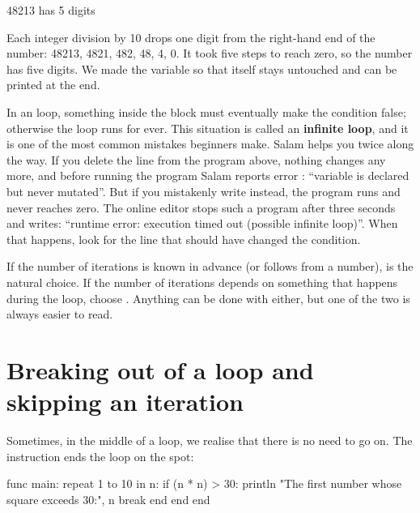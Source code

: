 \begin{salamout}
48213 has 5 digits
\end{salamout}

Each integer division by 10 drops one digit from the right-hand end of the
number: 48213, 4821, 482, 48, 4, 0. It took five steps to reach zero, so the
number has five digits. We made the variable  so that
 itself stays untouched and can be printed at the end.

\begin{warn}
In an  loop, something inside the block must eventually make
the condition false; otherwise the loop runs for ever. This situation is
called an \textbf{infinite loop}, and it is one of the most common mistakes
beginners make. Salam helps you twice along the way. If you delete the line
 from the program above, nothing changes
 any more, and before running the program Salam reports
error : ``variable  is declared
 but never mutated''. But if you mistakenly write
 instead, the program runs and  never
reaches zero. The online editor stops such a program after three seconds and
writes: ``runtime error: execution timed out (possible infinite loop)''.
When that happens, look for the line that should have changed the condition.
\end{warn}

\begin{note}
If the number of iterations is known in advance (or follows from a number),
 is the natural choice. If the number of iterations depends on
something that happens during the loop, choose . Anything can
be done with either, but one of the two is always easier to read.
\end{note}

\section{Breaking out of a loop and skipping an iteration}

Sometimes, in the middle of a loop, we realise that there is no need to go
on. The instruction  ends the loop on the spot:

\begin{salamcode}
func main:
    repeat 1 to 10 in n:
        if (n * n) > 30:
            println "The first number whose square exceeds 30:", n
            break
        end
    end
end
\end{salamcode}

